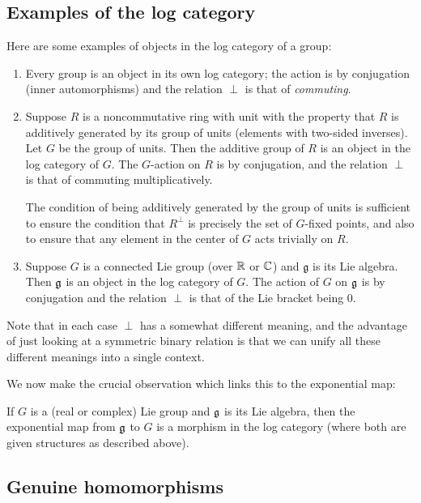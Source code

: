 \documentclass[a4paper]{amsart}
\begin{document}
\subsection{Examples of the log category}

Here are some examples of objects in the log category of a group:

\begin{enumerate}

\item Every group is an object in its own log category; the action is
  by conjugation (inner automorphisms) and the relation $\perp$ is
  that of {\em commuting}.

\item Suppose $R$ is a noncommutative ring with unit with the property
  that $R$ is additively generated by its group of units (elements
  with two-sided inverses). Let $G$ be the group of units. Then the
  additive group of $R$ is an object in the log category of $G$. The
  $G$-action on $R$ is by conjugation, and the relation $\perp$ is
  that of commuting multiplicatively.

  The condition of being additively generated by the group of units is
  sufficient to ensure the condition that $R^\perp$ is precisely the
  set of $G$-fixed points, and also to ensure that any element in the
  center of $G$ acts trivially on $R$.

\item Suppose $G$ is a connected Lie group (over $\mathbb{R}$ or $\mathbb{C}$) and
  $\mathfrak{g}$ is its Lie algebra. Then $\mathfrak{g}$ is an object
  in the log category of $G$. The action of $G$ on $\mathfrak{g}$ is by conjugation
  and the relation $\perp$ is that of the Lie bracket being $0$.

\end{enumerate}

Note that in each case $\perp$ has a somewhat different meaning, and
the advantage of just looking at a symmetric binary relation is that
we can unify all these different meanings into a single context.

We now make the crucial observation which links this to the exponential map:

If $G$ is a (real or complex) Lie group and $\mathfrak{g}$ is its Lie algebra,
then the exponential map from $\mathfrak{g}$ to $G$ is a morphism in the log
category (where both are given structures as described above).

\subsection{Genuine homomorphisms}
\end{document}
